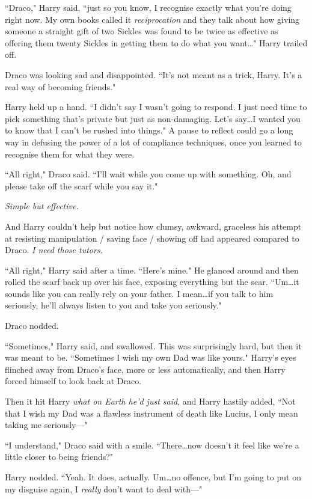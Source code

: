 ``Draco," Harry said, ``just so you know, I recognise exactly what you're doing right now. My own books called it \emph{reciprocation} and they talk about how giving someone a straight gift of two Sickles was found to be twice as effective as offering them twenty Sickles in getting them to do what you want…" Harry trailed off.

Draco was looking sad and disappointed. ``It's not meant as a trick, Harry. It's a real way of becoming friends."

Harry held up a hand. ``I didn't say I wasn't going to respond. I just need time to pick something that's private but just as non-damaging. Let's say…I wanted you to know that I can't be rushed into things." A pause to reflect could go a long way in defusing the power of a lot of compliance techniques, once you learned to recognise them for what they were.

``All right," Draco said. ``I'll wait while you come up with something. Oh, and please take off the scarf while you say it."

\emph{Simple but effective.}

And Harry couldn't help but notice how clumsy, awkward, graceless his attempt at resisting manipulation / saving face / showing off had appeared compared to Draco. \emph{I need those tutors.}

``All right," Harry said after a time. ``Here's mine." He glanced around and then rolled the scarf back up over his face, exposing everything but the scar. ``Um…it sounds like you can really rely on your father. I mean…if you talk to him seriously, he'll always listen to you and take you seriously."

Draco nodded.

``Sometimes," Harry said, and swallowed. This was surprisingly hard, but then it was meant to be. ``Sometimes I wish my own Dad was like yours." Harry's eyes flinched away from Draco's face, more or less automatically, and then Harry forced himself to look back at Draco.

Then it hit Harry \emph{what on Earth he'd just said}, and Harry hastily added, ``Not that I wish my Dad was a flawless instrument of death like Lucius, I only mean taking me seriously—"

``I understand," Draco said with a smile. ``There…now doesn't it feel like we're a little closer to being friends?"

Harry nodded. ``Yeah. It does, actually. Um…no offence, but I'm going to put on my disguise again, I \emph{really} don't want to deal with—"

